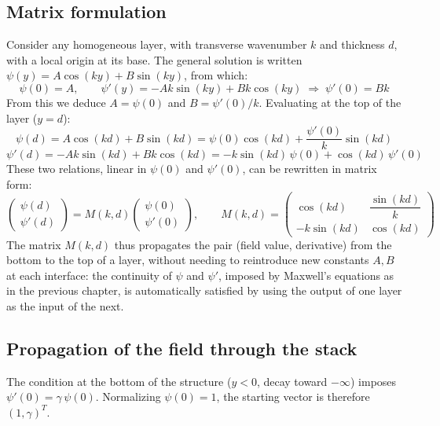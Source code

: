 \documentclass[a4paper,11pt]{report}
\begin{document}
\subsection*{Matrix formulation}

Consider any homogeneous layer, with transverse wavenumber $k$ and thickness $d$, with a local origin at its base. The general solution is written $\psi(y)=A\cos(ky)+B\sin(ky)$, from which:
\begin{equation}
\psi(0)=A, \qquad \psi'(y)=-Ak\sin(ky)+Bk\cos(ky) \;\Rightarrow\; \psi'(0)=Bk
\end{equation}
From this we deduce $A=\psi(0)$ and $B=\psi'(0)/k$. Evaluating at the top of the layer ($y=d$):
\begin{equation}
\psi(d)=A\cos(kd)+B\sin(kd) = \psi(0)\cos(kd)+\frac{\psi'(0)}{k}\sin(kd)
\end{equation}
\begin{equation}
\psi'(d)=-Ak\sin(kd)+Bk\cos(kd) = -k\sin(kd)\,\psi(0)+\cos(kd)\,\psi'(0)
\end{equation}
These two relations, linear in $\psi(0)$ and $\psi'(0)$, can be rewritten in matrix form:
\begin{equation}
\begin{pmatrix}\psi(d)\\\psi'(d)\end{pmatrix} = M(k,d)\begin{pmatrix}\psi(0)\\\psi'(0)\end{pmatrix}, \qquad
M(k,d)=\begin{pmatrix}\cos(kd) & \dfrac{\sin(kd)}{k} \\[4pt] -k\sin(kd) & \cos(kd)\end{pmatrix}
\label{eq:matrice_transfert}
\end{equation}
The matrix $M(k,d)$ thus propagates the pair (field value, derivative) from the bottom to the top of a layer, without needing to reintroduce new constants $A,B$ at each interface: the continuity of $\psi$ and $\psi'$, imposed by Maxwell's equations as in the previous chapter, is automatically satisfied by using the output of one layer as the input of the next.

\subsection*{Propagation of the field through the stack}

The condition at the bottom of the structure ($y<0$, decay toward $-\infty$) imposes $\psi'(0)=\gamma\,\psi(0)$. Normalizing $\psi(0)=1$, the starting vector is therefore $(1,\gamma)^T$.
\end{document}
